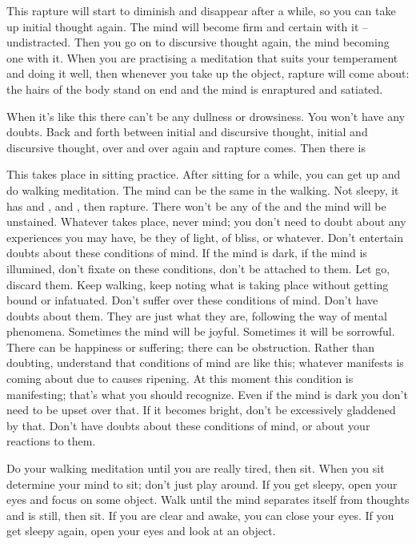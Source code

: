 This rapture will start to diminish and disappear after a while, so you can take up initial thought again. The mind will become firm and certain with it -- undistracted. Then you go on to discursive thought again, the mind becoming one with it. When you are practising a meditation that suits your temperament and doing it well, then whenever you take up the object, rapture will come about: the hairs of the body stand on end and the mind is enraptured and satiated.

When it's like this there can't be any dullness or drowsiness. You won't have any doubts. Back and forth between initial and discursive thought, initial and discursive thought, over and over again and rapture comes. Then there is 

This takes place in sitting practice. After sitting for a while, you can get up and do walking meditation. The mind can be the same in the walking. Not sleepy, it has  and ,  and , then rapture. There won't be any of the  and the mind will be unstained. Whatever takes place, never mind; you don't need to doubt about any experiences you may have, be they of light, of bliss, or whatever. Don't entertain doubts about these conditions of mind. If the mind is dark, if the mind is illumined, don't fixate on these conditions, don't be attached to them. Let go, discard them. Keep walking, keep noting what is taking place without getting bound or infatuated. Don't suffer over these conditions of mind. Don't have doubts about them. They are just what they are, following the way of mental phenomena. Sometimes the mind will be joyful. Sometimes it will be sorrowful. There can be happiness or suffering; there can be obstruction. Rather than doubting, understand that conditions of mind are like this; whatever manifests is coming about due to causes ripening. At this moment this condition is manifesting; that's what you should recognize. Even if the mind is dark you don't need to be upset over that. If it becomes bright, don't be excessively gladdened by that. Don't have doubts about these conditions of mind, or about your reactions to them.

Do your walking meditation until you are really tired, then sit. When you sit determine your mind to sit; don't just play around. If you get sleepy, open your eyes and focus on some object. Walk until the mind separates itself from thoughts and is still, then sit. If you are clear and awake, you can close your eyes. If you get sleepy again, open your eyes and look at an object.

